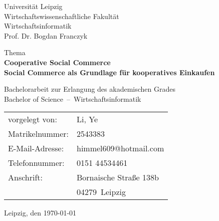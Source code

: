 
\newcommand{\trtitleone}{Cooperative Social Commerce}
\newcommand{\trtitletwo}{Social Commerce als Grundlage für kooperatives Einkaufen}
\newcommand{\trtype}{Bachelorarbeit zur Erlangung des akademischen Grades}
\newcommand{\trabschluss}{Bachelor of Science}
\newcommand{\trauthor}{Li, Ye}
\newcommand{\trstrasse}{Bornaische Straße 138b}
\newcommand{\trmatrikelnummer}{2543383}
\newcommand{\trplz}{04279}
\newcommand{\trort}{Leipzig}
\newcommand{\tremail}{himmel609@hotmail.com}
\newcommand{\trtelefon}{0151 44534461}
\newcommand{\truni}{Universität Leipzig}
\newcommand{\trfakultaet}{Wirtschaftswissenschaftliche Fakultät}
\newcommand{\trfachbereich}{Wirtschaftsinformatik}
\newcommand{\trstudiengang}{Wirtschaftsinformatik}
\newcommand{\trprofessor}{Prof. Dr. Bogdan Franczyk}

\newcommand{\trdate}{\today}

\thispagestyle{empty}

\truni\\
\trfakultaet\\
\trfachbereich\\
\trprofessor

\vspace{3cm}

\begin{center}
	Thema\\[1cm]
	\textbf{\LARGE \trtitleone}\\[0.1cm]
	\textbf{\large \trtitletwo}
\end{center}

\vspace{0.2cm}

\begin{center}
  \trtype \\
  \trabschluss~--~\trstudiengang \\
\end{center}

\vfill

\begin{table}[htbp]
\begin{tabular}{l l}
vorgelegt von: & \trauthor \\
Matrikelnummer: & \trmatrikelnummer \\
E-Mail-Adresse: & \tremail \\
Telefonnummer: & \trtelefon \\
Anschrift: & \trstrasse \\
& \trplz~\trort \\
\end{tabular}
\end{table}

\vspace{0.25cm}

\trort, den \today
